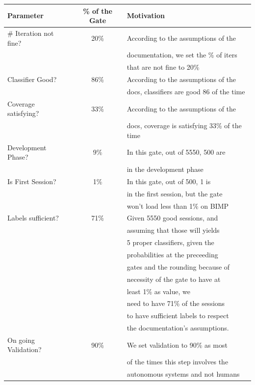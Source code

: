 \begin{table}[H]
    \centering
    \begin{tabularx}{\textwidth}{|X|c|l|}
    \hline
    \textbf{Parameter} & \textbf{\% of the Gate} & \textbf{Motivation} \\
    \hline
     \# Iteration not fine? & 20\% & According to the assumptions of the \\
     & & documentation, we set the \% of iters \\
     & & that are not fine to 20\% \\
    \hline
    Classifier Good? & 86\% & According to the assumptions of the \\
     & & docs, classifiers are good 86 of the time \\
    \hline
    Coverage satisfying? & 33\% & According to the assumptions of the \\
     & & docs, coverage is satisfying 33\% of the time \\
    \hline
    Development Phase? & 9\% & In this gate, out of 5550, 500 are \\
     & & in the development phase \\
    \hline
    Is First Session? & 1\% & In this gate, out of 500, 1 is 
    \\ & & in the first session, but the gate
    \\ & & won't load less than 1\% on BIMP 
    \\
    \hline
    Labels sufficient? & 71\% & Given 5550 good sessions, and 
    \\ & & assuming that those will yields
    \\ & & 5 proper classifiers, given the 
    \\ & & probabilities at the preceeding 
    \\ & & gates and the rounding because of 
    \\ & & necessity of the gate to have at 
    \\ & & least 1\% as value, we 
    \\ & & need to have 71\% of the sessions 
    \\ & & to have sufficient labels to respect 
    \\ & & the documentation's assumptions.
    \\
    \hline
    On going Validation? & 90\% & We set validation to 90\% as most
    \\ & & of the times this step involves the
    \\ & & autonomous systems and not humans \\

\end{tabularx}
\end{table}
